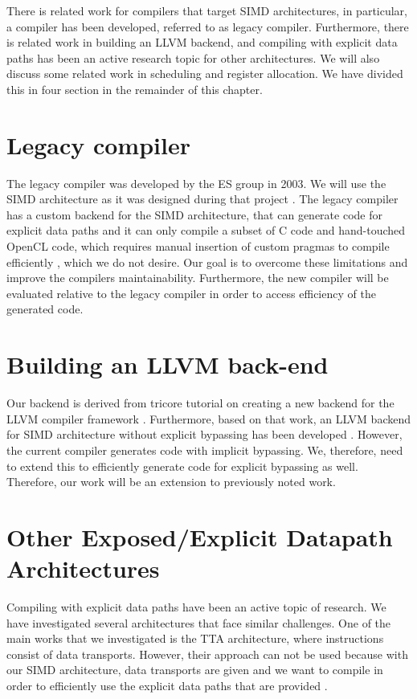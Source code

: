 There is related work for compilers that target SIMD architectures, in particular, a compiler has been developed, referred to as legacy compiler. Furthermore, there is related work in building an LLVM backend, and compiling with explicit data paths has been an active research topic for other architectures. We will also discuss some related work in scheduling and register allocation. We have divided this in four section in the remainder of this chapter.

\section{Legacy compiler}
The legacy compiler was developed by the ES group in 2003. We will use the SIMD architecture as it was designed during that project \cite{simd}. The legacy compiler has a custom backend for the SIMD architecture, that can generate code for explicit data paths \cite{dongrio1} and it can only compile a subset of C code and hand-touched OpenCL code, which requires manual insertion of custom pragmas to compile efficiently \cite{dongrio2}, which we do not desire. Our goal is to overcome these limitations and improve the compilers maintainability. Furthermore, the new compiler will be evaluated relative to the legacy compiler in order to access efficiency of the generated code.

\section{Building an LLVM back-end}
Our backend is derived from tricore tutorial on creating a new backend for the LLVM compiler framework \cite{tricore}. Furthermore, based on that work, an LLVM backend for SIMD architecture without explicit bypassing has been developed \cite{liu_zhenyuan}. However, the current compiler generates code with implicit bypassing. We, therefore, need to extend this to efficiently generate code for explicit bypassing as well. Therefore, our work will be an extension to previously noted work.

\section{Other Exposed/Explicit Datapath Architectures}
Compiling with explicit data paths have been an active topic of research. We have investigated several architectures that face similar challenges. One of the main works that we investigated is the TTA architecture, where instructions consist of data transports. However, their approach can not be used because with our SIMD architecture, data transports are given and we want to compile in order to efficiently use the explicit data paths that are provided \cite{tta, tta_codegen}.

